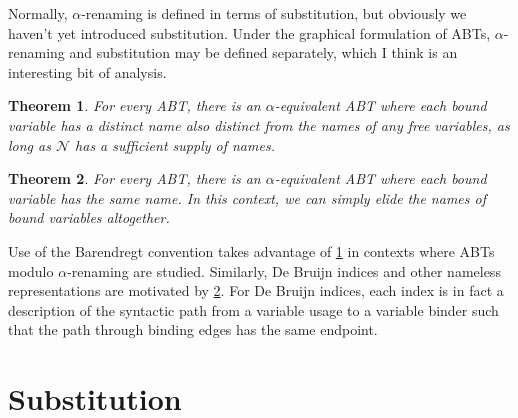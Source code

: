 \documentclass[11pt]{article} %
\newtheorem{thm}{Theorem}
\theoremstyle{definition}
\begin{document}
Normally, $\alpha$-renaming is defined in terms of substitution, but obviously we haven't yet introduced substitution.
Under the graphical formulation of ABTs, $\alpha$-renaming and substitution may be defined separately, which I think is an interesting bit of analysis.

\begin{thm}
\label{thm:unique-names}
For every ABT, there is an $\alpha$-equivalent ABT where each bound variable has a distinct name also distinct from the names of any free variables, as long as $\mathcal{N}$ has a sufficient supply of names.
\end{thm}

\begin{thm}
\label{thm:singleton-names}
For every ABT, there is an $\alpha$-equivalent ABT where each bound variable has the same name.
In this context, we can simply elide the names of bound variables altogether.
\end{thm}

Use of the Barendregt convention takes advantage of \cref{thm:unique-names} in contexts where ABTs modulo $\alpha$-renaming are studied.
Similarly, De Bruijn indices and other nameless representations are motivated by \cref{thm:singleton-names}.
For De Bruijn indices, each index is in fact a description of the syntactic path from a variable usage to a variable binder such that the path through binding edges has the same endpoint.


\section{Substitution}
\end{document}
